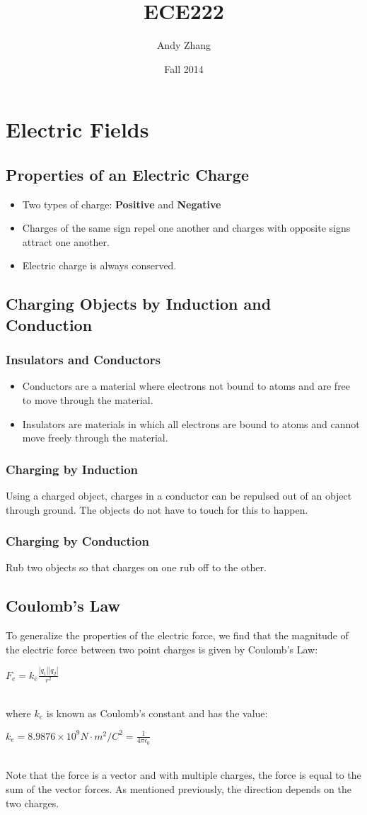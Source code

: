 \documentclass[12pt]{report}
\title{ECE222}
\author{{Andy Zhang}}
\date{{Fall 2014}}
\begin{document}
\chapter{Electric Fields}
	\section{Properties of an Electric Charge}
		\begin{itemize}
			\item Two types of charge: \textbf{Positive} and \textbf{Negative}
			\item Charges of the same sign repel one another and charges with opposite signs attract one another.
			\item Electric charge is always conserved.
		\end{itemize}
	\section{Charging Objects by Induction and Conduction}
		\subsection{Insulators and Conductors}
		\begin{itemize}
			\item Conductors are a material where electrons not bound to atoms and are free to move through the material.
			\item Insulators are materials in which all electrons are bound to atoms and cannot move freely through the material.
		\end{itemize}
		\subsection{Charging by Induction}
			Using a charged object, charges in a conductor can be repulsed out of an object through ground. The objects do not have to touch for this to happen.
		\subsection{Charging by Conduction}
			Rub two objects so that charges on one rub off to the other.
	\section{Coulomb's Law}
		To generalize the properties of the electric force, we find that the magnitude of the electric force between two point charges is given by Coulomb's Law:\\
		\centerline{$F_e = k_e \frac{|q_1||q_2|}{r^2}$}\\
		where $k_e$ is known as Coulomb's constant and has the value:\\
		\centerline{$k_e = 8.9876 \times 10^9 N \cdot m^2/C^2 = \frac{1}{4\pi \epsilon_0}$ }\\
		Note that the force is a vector and with multiple charges, the force is equal to the sum of the vector forces. As mentioned previously, the direction depends on the two charges.
\end{document}
